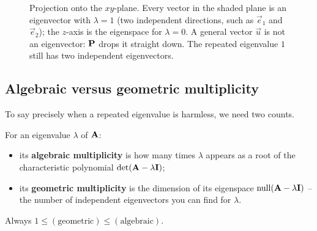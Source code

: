 \begin{figure}[H]
\centering
{}
\caption{Projection onto the $xy$-plane. Every vector in the shaded plane is an
eigenvector with $\lambda = 1$ (two independent directions, such as $\vec{e}_1$
and $\vec{e}_2$); the $z$-axis is the eigenspace for $\lambda = 0$. A general
vector $\vec{u}$ is not an eigenvector: $\mathbf{P}$ drops it straight down. The
repeated eigenvalue $1$ still has two independent eigenvectors.}
\label{ch24:fig-projection}
\end{figure}

\subsection{Algebraic versus geometric multiplicity}
\label{ch24:multiplicity}

To say precisely when a repeated eigenvalue is harmless, we need two counts.

\begin{definition}
\label{ch24:def-mult}
For an eigenvalue $\lambda$ of $\mathbf{A}$:
\begin{itemize}
  \item its \textbf{algebraic multiplicity} is how many times $\lambda$ appears
        as a root of the characteristic polynomial $\det(\mathbf{A}-\lambda\mathbf{I})$;
  \item its \textbf{geometric multiplicity} is the dimension of its eigenspace
        $\operatorname{null}(\mathbf{A}-\lambda\mathbf{I})$ -- the number of independent
        eigenvectors you can find for $\lambda$.
\end{itemize}
Always $1 \le (\text{geometric}) \le (\text{algebraic})$.
\end{definition}

